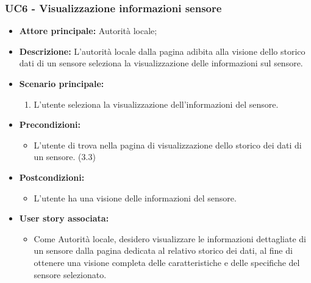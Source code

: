 \subsubsection{UC6 - Visualizzazione informazioni sensore}
\begin{itemize}
    \item \textbf{Attore principale:} Autorità locale;
    \item \textbf{Descrizione:} L’autorità locale dalla pagina adibita alla visione dello storico dati di un sensore seleziona la visualizzazione delle informazioni sul sensore.
    \item \textbf{Scenario principale:}
          \begin{enumerate}
              \item L'utente seleziona la visualizzazione dell'informazioni del sensore.
          \end{enumerate}
    \item \textbf{Precondizioni:}
          \begin{itemize}
              \item  L'utente di trova nella pagina di visualizzazione dello storico dei dati di un sensore. (3.3)
          \end{itemize}
    \item \textbf{Postcondizioni:}
          \begin{itemize}
              \item  L'utente ha una visione delle informazioni del sensore.
          \end{itemize}
    \item \textbf{User story associata:}
          \begin{itemize}
              \item Come Autorità locale, desidero visualizzare le informazioni dettagliate di un sensore dalla pagina dedicata al relativo storico dei dati, al fine di ottenere una visione completa delle caratteristiche e delle specifiche del sensore selezionato.
          \end{itemize}
\end{itemize}
